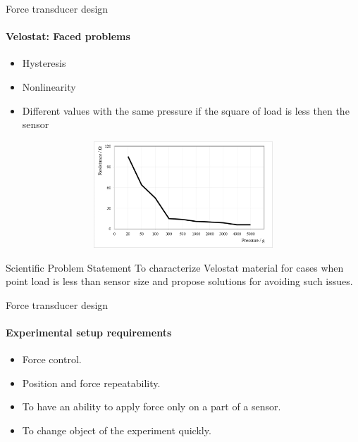 \documentclass[aspectratio=169]{beamer}
\begin{document}
\begin{frame}[t]{Force transducer design}
    \framesubtitle{Velostat: Faced problems}
    \vspace{-20pt}
    \begin{multicols}{2}
        {\Large
            \begin{itemize}
                \item Hysteresis
                \item Nonlinearity
                \item Different values with the same pressure if the square of load is less then the sensor
            \end{itemize}}
        \begin{figure}[H]
            \centering\includegraphics[height=4cm,width=1\textwidth,keepaspectratio]{velostat_pressure_resistance.jpg}
            \label{fig:velostat_pressure_resistance.jpg}
        \end{figure}
    \end{multicols}
    \vspace{-12pt}
    \begin{block}{Scientific Problem Statement}
        To characterize Velostat material for cases when point load is less than sensor size and propose solutions for avoiding such issues.
    \end{block}
\end{frame}

\begin{frame}[t]{Force transducer design}
    \framesubtitle{Experimental setup requirements}
    \vspace{-0.5cm}
    {\Large
        \begin{itemize}
            \item Force control. 
            \item Position and force repeatability. 
            \item To have an ability to apply force only on a part of a sensor. 
            \item To change object of the experiment quickly. 
        \end{itemize}}
\end{frame}
\end{document}
